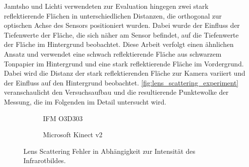 \documentclass[thesis.tex]{subfiles}
\begin{document}
Jamtsho und Lichti \cite{bib:Jamtsho2010} verwendeten zur Evaluation hingegen zwei stark reflektierende Flächen in unterschiedlichen Distanzen, die orthogonal zur optischen Achse des Sensors positioniert wurden. Dabei wurde der Einfluss der Tiefenwerte der Fläche, die sich näher am Sensor befindet, auf die Tiefenwerte der Fläche im Hintergrund beobachtet. Diese Arbeit verfolgt einen ähnlichen Ansatz und verwendet eine schwach reflektierende Fläche aus schwarzem Tonpapier im Hintergrund und eine stark reflektierende Fläche im Vordergrund. Dabei wird die Distanz der stark reflektierenden Fläche zur Kamera variiert und der Einfluss auf den Hintergrund beobachtet. \autoref{fig:lens_scattering_experiment} veranschaulicht den Versuchsaufbau und die resultierende Punktewolke der Messung, die im Folgenden im Detail untersucht wird.

\begin{figure}[h!]
\centering
\begin{subfigure}{0.49\textwidth}
\centering
{}
\caption{IFM O3D303}
\label{fig:lens_scattering_results_o3d393}
\end{subfigure}
\begin{subfigure}{0.49\textwidth}
\centering
{}
\caption{Microsoft Kinect v2}
\label{fig:lens_scattering_results_kinect_v2}
\end{subfigure}
\caption{Lens Scattering Fehler in Abhängigkeit zur Intensität des Infrarotbildes.}
\label{fig:lens_scattering_results}
\end{figure}
\end{document}

